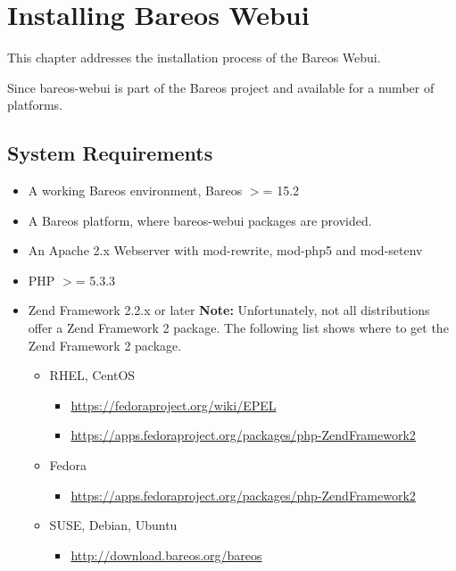 
\chapter{Installing Bareos Webui}
\label{sec:webui}
\label{sec:install-webui}

This chapter addresses the installation process of the Bareos Webui.

Since  bareos-webui is part of the Bareos project and available for a number of platforms.


\section{System Requirements}

\begin{itemize}
\item A working Bareos environment, Bareos $>$= 15.2
\item A Bareos platform, where bareos-webui packages are provided.
\item An Apache 2.x Webserver with mod-rewrite, mod-php5 and mod-setenv
\item PHP $>$= 5.3.3
\item Zend Framework 2.2.x or later
  \textbf{Note:} Unfortunately, not all distributions offer a Zend Framework 2 package.
  The following list shows where to get the Zend Framework 2 package.
  \begin{itemize}
  \item RHEL, CentOS
    \begin{itemize}
    \item \url{https://fedoraproject.org/wiki/EPEL}
    \item \url{https://apps.fedoraproject.org/packages/php-ZendFramework2}
    \end{itemize}

  \item Fedora
    \begin{itemize}
    \item \url{https://apps.fedoraproject.org/packages/php-ZendFramework2}
    \end{itemize}

  \item SUSE, Debian, Ubuntu
    \begin{itemize}
    \item \url{http://download.bareos.org/bareos}
    \end{itemize}
  \end{itemize}
\end{itemize}

